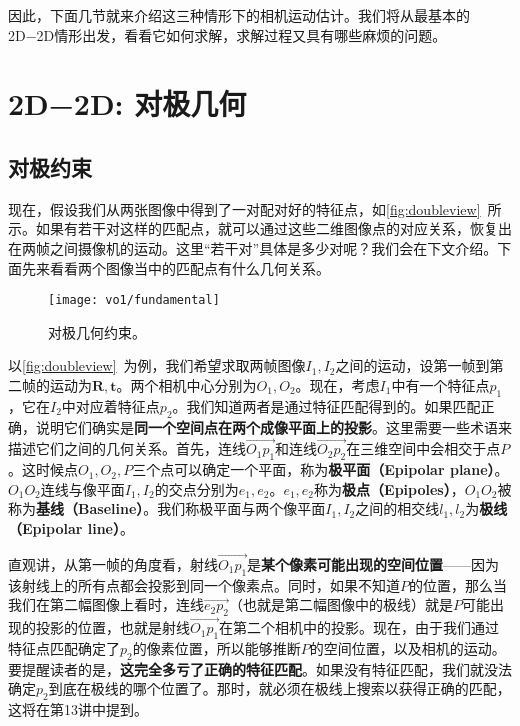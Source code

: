 因此，下面几节就来介绍这三种情形下的相机运动估计。我们将从最基本的2D−2D情形出发，看看它如何求解，求解过程又具有哪些麻烦的问题。

\section{2D−2D: 对极几何}
\label{sec:epipolar-geometry}

\subsection{对极约束}

现在，假设我们从两张图像中得到了一对配对好的特征点，如\autoref{fig:doubleview}~所示。如果有若干对这样的匹配点，就可以通过这些二维图像点的对应关系，恢复出在两帧之间摄像机的运动。这里“若干对”具体是多少对呢？我们会在下文介绍。下面先来看看两个图像当中的匹配点有什么几何关系。

\begin{figure}[!htp]
	\centering
	\texttt{[image: vo1/fundamental]}
	\caption{对极几何约束。}
	\label{fig:doubleview}
\end{figure}

以\autoref{fig:doubleview}~为例，我们希望求取两帧图像$I_{1}, I_{2}$之间的运动，设第一帧到第二帧的运动为$\bm{R}, \bm{t}$。两个相机中心分别为$O_{1}, O_{2}$。现在，考虑$I_{1}$中有一个特征点$p_{1}$，它在$I_{2}$中对应着特征点$p_{2}$。我们知道两者是通过特征匹配得到的。如果匹配正确，说明它们确实是\textbf{同一个空间点在两个成像平面上的投影}。这里需要一些术语来描述它们之间的几何关系。首先，连线$\overrightarrow{O_{1}p_{1}}$和连线$\overrightarrow{O_{2}p_{2}}$在三维空间中会相交于点$P$。这时候点$O_{1},O_{2},P$三个点可以确定一个平面，称为\textbf{极平面（Epipolar plane）}。$O_{1}O_{2}$连线与像平面$I_{1},I_{2}$的交点分别为$e_{1},e_{2}$。$e_{1},e_{2}$称为\textbf{极点（Epipoles）}，$O_{1}O_{2}$被称为\textbf{基线（Baseline）}。我们称极平面与两个像平面$I_{1}, I_{2}$之间的相交线$l_{1},l_{2}$为\textbf{极线（Epipolar line）}。

直观讲，从第一帧的角度看，射线$\overrightarrow{O_1 p_1}$是\textbf{某个像素可能出现的空间位置}——因为该射线上的所有点都会投影到同一个像素点。同时，如果不知道$P$的位置，那么当我们在第二幅图像上看时，连线$\overrightarrow{e_2 p_2}$（也就是第二幅图像中的极线）就是$P$可能出现的投影的位置，也就是射线$\overrightarrow{O_1 p_1}$在第二个相机中的投影。现在，由于我们通过特征点匹配确定了$p_2$的像素位置，所以能够推断$P$的空间位置，以及相机的运动。要提醒读者的是，\textbf{这完全多亏了正确的特征匹配}。如果没有特征匹配，我们就没法确定$p_2$到底在极线的哪个位置了。那时，就必须在极线上搜索以获得正确的匹配，这将在第13讲中提到。

